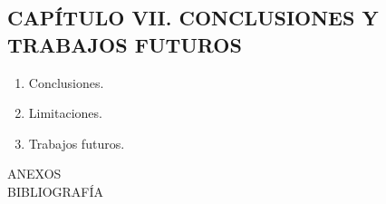 \subsection*{CAPÍTULO VII. CONCLUSIONES Y TRABAJOS FUTUROS}
\begin{enumerate}
    \item[7.1] Conclusiones.
    \item[7.2] Limitaciones.
    \item[7.3] Trabajos futuros.
\end{enumerate}

ANEXOS\\
BIBLIOGRAFÍA\\
